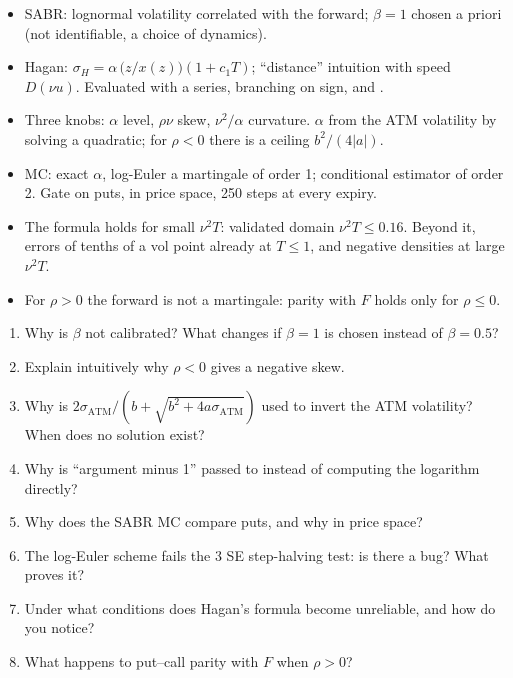 \begin{riassunto}
\begin{itemize}
\item SABR: lognormal volatility correlated with the forward; $\beta=1$ chosen a priori (not identifiable, a choice of
dynamics).
\item Hagan: $\sigma_H=\alpha\,\big(z/x(z)\big)(1+c_1T)$; ``distance'' intuition with speed $D(\nu u)$. Evaluated
with a series, branching on sign, and .
\item Three knobs: $\alpha$ level, $\rho\nu$ skew, $\nu^2/\alpha$ curvature. $\alpha$ from the ATM volatility by
solving a quadratic; for $\rho<0$ there is a ceiling $b^2/(4|a|)$.
\item MC: exact $\alpha$, log-Euler a martingale of order 1; conditional estimator of order 2. Gate on puts, in price
space, 250 steps at every expiry.
\item The formula holds for small $\nu^2T$: validated domain $\nu^2T\le0.16$. Beyond it, errors of tenths of a vol
point already at $T\le1$, and negative densities at large $\nu^2T$.
\item For $\rho>0$ the forward is not a martingale: parity with $F$ holds only for $\rho\le0$.
\end{itemize}
\end{riassunto}

\begin{domande}
\begin{enumerate}
\item Why is $\beta$ not calibrated? What changes if $\beta=1$ is chosen instead of $\beta=0.5$?
\item Explain intuitively why $\rho<0$ gives a negative skew.
\item Why is $2\sigma_{\mathrm{ATM}}/(b+\sqrt{b^2+4a\sigma_{\mathrm{ATM}}})$ used to invert the ATM volatility? When
does no solution exist?
\item Why is ``argument minus 1'' passed to  instead of computing the logarithm directly?
\item Why does the SABR MC compare puts, and why in price space?
\item The log-Euler scheme fails the 3 SE step-halving test: is there a bug? What proves it?
\item Under what conditions does Hagan's formula become unreliable, and how do you notice?
\item What happens to put--call parity with $F$ when $\rho>0$?
\end{enumerate}
\end{domande}
